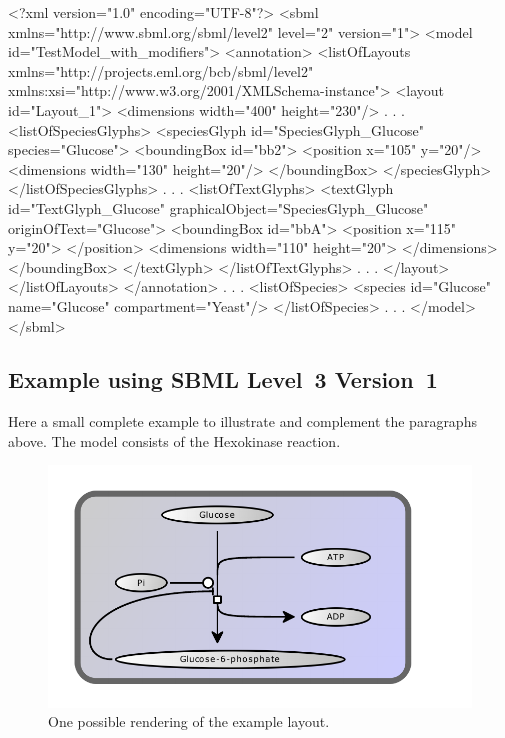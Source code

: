 \label{example:textglyph}
\begin{example}
<?xml version="1.0" encoding="UTF-8"?>
<sbml xmlns="http://www.sbml.org/sbml/level2" level="2" version="1">
  <model id="TestModel_with_modifiers">
    <annotation>
     <listOfLayouts xmlns="http://projects.eml.org/bcb/sbml/level2"
              xmlns:xsi="http://www.w3.org/2001/XMLSchema-instance">
      <layout id="Layout_1">
        <dimensions width="400" height="230"/>
                .
                .
                .
        <listOfSpeciesGlyphs>
          <speciesGlyph id="SpeciesGlyph_Glucose" species="Glucose">
            <boundingBox id="bb2">
              <position x="105" y="20"/>
              <dimensions width="130" height="20"/>
            </boundingBox>
          </speciesGlyph>
        </listOfSpeciesGlyphs>  
                .
                .
                .
        <listOfTextGlyphs>
          <textGlyph id="TextGlyph_Glucose" graphicalObject="SpeciesGlyph_Glucose"
                     originOfText="Glucose">
            <boundingBox id="bbA">
              <position x="115" y="20">
              </position>
              <dimensions width="110" height="20">
              </dimensions>
            </boundingBox>
          </textGlyph>
        </listOfTextGlyphs>  
            .
            .
            .
      </layout>
     </listOfLayouts>
    </annotation>    
         .
         .
         .
    <listOfSpecies>
      <species id="Glucose" name="Glucose" compartment="Yeast"/>
    </listOfSpecies>
       .
       .
       .  
  </model>
</sbml>
\end{example}

\subsection{Example using SBML Level~3 Version~1}
Here a small complete example to illustrate and complement the 
paragraphs above. The model consists of the Hexokinase reaction. 


\begin{center}
\begin{figure}[h!]
\includegraphics{figures/layout-spec-example}
\caption{One possible rendering of the example layout.}
\end{figure}
\end{center}

